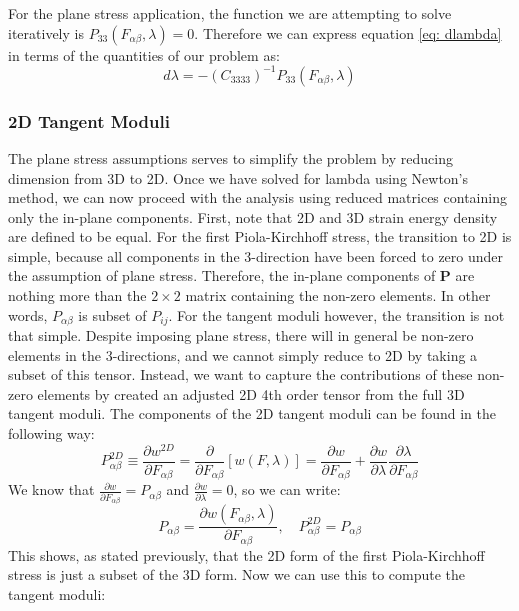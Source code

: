 \documentclass[]{spie}  %
\begin{document}
For the plane stress application, the function we are attempting to solve iteratively is $P_{33}(F_{\alpha\beta}, \lambda) = 0$. Therefore we can express equation \ref{eq: dlambda} in terms of the quantities of our problem as:
\begin{equation}
\label{eq: dlambda P}
d\lambda = - (C_{3333})^{-1} P_{33}(F_{\alpha\beta}, \lambda)
\end{equation}

\subsubsection{2D Tangent Moduli}
The plane stress assumptions serves to simplify the problem by reducing dimension from 3D to 2D. Once we have solved for lambda using Newton's method, we can now proceed with the analysis using reduced matrices containing only the in-plane components. First, note that 2D and 3D strain energy density are defined to be equal. For the first Piola-Kirchhoff stress, the transition to 2D is simple, because all components in the 3-direction have been forced to zero under the assumption of plane stress. Therefore, the in-plane components of $\bm{P}$ are nothing more than the $2 \times 2$ matrix containing the non-zero elements. In other words, $P_{\alpha\beta}$ is subset of $P_{ij}$. For the tangent moduli however, the transition is not that simple. Despite imposing plane stress, there will in general be non-zero elements in the 3-directions, and we cannot simply reduce to 2D by taking a subset of this tensor. Instead, we want to capture the contributions of these non-zero elements by created an adjusted 2D 4th order tensor from the full 3D tangent moduli. The components of the 2D tangent moduli can be found in the following way:
\begin{equation}
P^{2D}_{\alpha\beta} \equiv \frac{\partial w^{2D}}{\partial F_{\alpha\beta}} = \frac{\partial}{\partial F_{\alpha\beta}}
						\left[ w(F, \lambda) \right] = \frac{\partial w}{\partial F_{\alpha\beta}} + \frac{\partial w}{\partial \lambda} \frac{\partial \lambda}{\partial F_{\alpha\beta}}
\end{equation}
We know that $\frac{\partial w}{\partial F_{\alpha\beta}} = P_{\alpha\beta}$ and $\frac{\partial w}{\partial \lambda} = 0$, so we can write:
\begin{equation}
P_{\alpha\beta} = \frac{\partial w(F_{\alpha\beta}, \lambda)}{\partial F_{\alpha\beta}}, \quad P^{2D}_{\alpha\beta} = P_{\alpha\beta}
\end{equation}
This shows, as stated previously, that the 2D form of the first Piola-Kirchhoff stress is just a subset of the 3D form. Now we can use this to compute the tangent moduli:
\end{document}
